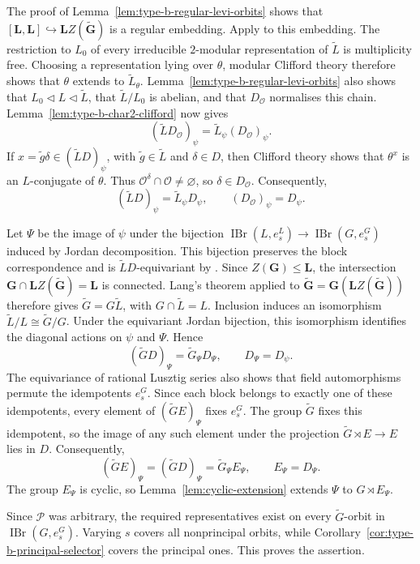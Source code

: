 \documentclass[10pt]{amsart}
\theoremstyle{definition}
\renewcommand{\leq}{\leqslant}
\let\oldendproof\endproof
\renewenvironment{proof}[1][\proofname]{%
  \oldproof[\bfseries #1]%
}{\oldendproof}
\DeclareMathOperator{\IBr}{IBr}
\numberwithin{equation}{section}
\numberwithin{table}{section}
\begin{document}
\begin{proof}
The proof of Lemma~\ref{lem:type-b-regular-levi-orbits} shows that
$[\mathbf L,\mathbf L]\hookrightarrow\mathbf LZ(\widetilde{\mathbf G})$
is a regular embedding. Apply \cite[Theorem~1.7.15]{GeckMalle2020}
to this embedding.
The restriction to $L_0$ of every irreducible $2$-modular
representation of $\widetilde L$ is multiplicity free.
Choosing a representation lying over $\theta$, modular Clifford
theory therefore shows that $\theta$ extends to $\widetilde L_\theta$.
Lemma~\ref{lem:type-b-regular-levi-orbits} also shows that
$L_0\lhd L\lhd\widetilde L$, that $\widetilde L/L_0$ is abelian,
and that $D_{\mathcal O}$ normalises this chain.
Lemma~\ref{lem:type-b-char2-clifford} now gives
\[
 (\widetilde L D_{\mathcal O})_\psi
 =\widetilde L_\psi(D_{\mathcal O})_\psi.
\]
If $x=\widetilde g\delta\in(\widetilde L D)_\psi$, with
$\widetilde g\in\widetilde L$ and $\delta\in D$, then Clifford
theory shows that $\theta^x$ is an $L$-conjugate of $\theta$.
Thus $\mathcal O^\delta\cap\mathcal O\neq\varnothing$, so
$\delta\in D_{\mathcal O}$.
Consequently,
\[
 (\widetilde L D)_\psi=\widetilde L_\psi D_\psi,
 \qquad (D_{\mathcal O})_\psi=D_\psi.
\]

Let $\Psi$ be the image of $\psi$ under the bijection
$\IBr(L,e_s^L)\longrightarrow\IBr(G,e_s^G)$ induced by Jordan
decomposition. This bijection preserves the block correspondence and is
$\widetilde L D$-equivariant by
\cite[Lemma~5.1 and the proof of Proposition~5.2]{FengLiZhang2022Jordan}.
Since $Z(\mathbf G)\leq\mathbf L$, the intersection
$\mathbf G\cap\mathbf LZ(\widetilde{\mathbf G})=\mathbf L$ is connected.
Lang's theorem applied to
$\widetilde{\mathbf G}=\mathbf G(\mathbf LZ(\widetilde{\mathbf G}))$
therefore gives $\widetilde G=G\widetilde L$, with
$G\cap\widetilde L=L$. Inclusion induces an isomorphism
$\widetilde L/L\cong\widetilde G/G$.
Under the equivariant Jordan bijection, this isomorphism identifies
the diagonal actions on $\psi$ and $\Psi$. Hence
\[
 (\widetilde G D)_\Psi=\widetilde G_\Psi D_\Psi,
 \qquad D_\Psi=D_\psi.
\]
The equivariance of rational Lusztig series
\cite[Proposition~7.2]{Taylor2018Automorphisms} also shows that field
automorphisms permute the idempotents $e_s^G$.
Since each block belongs to exactly one of these idempotents,
every element of $(\widetilde G E)_\Psi$ fixes $e_s^G$.
The group $\widetilde G$ fixes this idempotent, so the image of any
such element under the projection $\widetilde G\rtimes E\longrightarrow E$
lies in $D$. Consequently,
\[
 (\widetilde G E)_\Psi=(\widetilde G D)_\Psi
 =\widetilde G_\Psi E_\Psi,\qquad E_\Psi=D_\Psi.
\]
The group $E_\Psi$ is cyclic, so Lemma~\ref{lem:cyclic-extension}
extends $\Psi$ to $G\rtimes E_\Psi$.

Since $\mathcal P$ was arbitrary, the required representatives
exist on every $\widetilde G$-orbit in $\IBr(G,e_s^G)$.
Varying $s$ covers all nonprincipal orbits, while
Corollary~\ref{cor:type-b-principal-selector} covers the principal
ones. This proves the assertion.
\end{proof}
\end{document}
